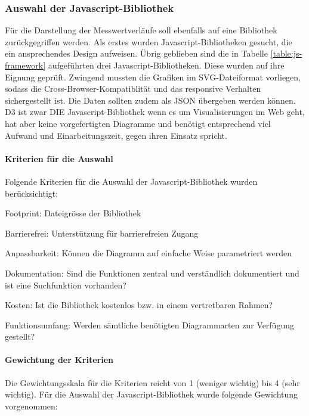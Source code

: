 \subsubsection{Auswahl der Javascript-Bibliothek}
Für die Darstellung der Messwertverläufe soll ebenfalls auf eine Bibliothek zurückgegriffen werden. Als erstes wurden Javascript-Bibliotheken gesucht, die ein ansprechendes Design aufweisen. Übrig geblieben sind die in Tabelle \ref{table:js-framework} aufgeführten drei Javascript-Bibliotheken. Diese wurden auf ihre Eignung geprüft. Zwingend mussten die Grafiken im SVG-Dateiformat vorliegen, sodass die Cross-Browser-Kompatiblität und das responsive Verhalten sichergestellt ist. Die Daten sollten zudem als JSON übergeben werden können. D3 ist zwar DIE Javascript-Bibliothek wenn es um Visualisierungen im Web geht, hat aber keine vorgefertigten Diagramme und benötigt entsprechend viel Aufwand und Einarbeitungszeit, gegen ihren Einsatz spricht.



\paragraph*{Kriterien für die Auswahl}
Folgende Kriterien für die Auswahl der Javascript-Bibliothek wurden berücksichtigt:

\begin{itemize*}
\item Footprint: Dateigrösse der Bibliothek
\item Barrierefrei: Unterstützung für barrierefreien Zugang
\item Anpassbarkeit: Können die Diagramm auf einfache Weise parametriert werden
\item Dokumentation: Sind die Funktionen zentral und verständlich dokumentiert und ist eine Suchfunktion vorhanden?
\item Kosten: Ist die Bibliothek kostenlos bzw. in einem vertretbaren Rahmen?
\item Funktionsumfang: Werden sämtliche benötigten Diagrammarten zur Verfügung gestellt?
\end{itemize*}



\paragraph*{Gewichtung der Kriterien}
Die Gewichtungsskala für die Kriterien reicht von 1 (weniger wichtig) bis 4 (sehr wichtig). Für die Auswahl der Javascript-Bibliothek wurde folgende Gewichtung vorgenommen:

